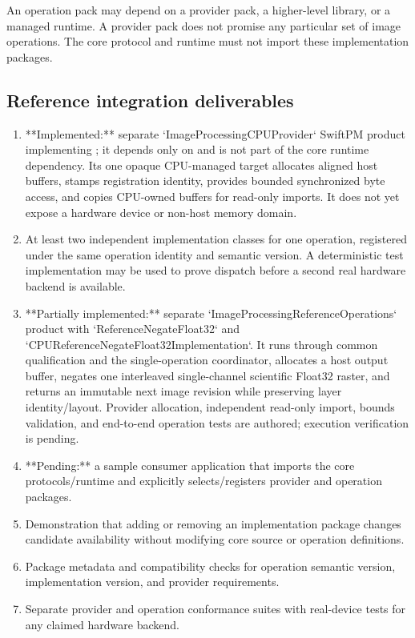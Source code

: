 An operation pack may depend on a provider pack, a higher-level library, or a managed runtime. A provider pack does not promise any particular set of image operations. The core protocol and runtime must not import these implementation packages.

\subsection{Reference integration deliverables}

\begin{enumerate}
  \item **Implemented:** separate `ImageProcessingCPUProvider` SwiftPM product implementing \GEP{}; it depends only on \GEP{} and is not part of the core runtime dependency. Its one opaque CPU-managed target allocates aligned host buffers, stamps registration identity, provides bounded synchronized byte access, and copies CPU-owned buffers for read-only imports. It does not yet expose a hardware device or non-host memory domain.
  \item At least two independent implementation classes for one operation, registered under the same operation identity and semantic version. A deterministic test implementation may be used to prove dispatch before a second real hardware backend is available.
  \item **Partially implemented:** separate `ImageProcessingReferenceOperations` product with `ReferenceNegateFloat32` and `CPUReferenceNegateFloat32Implementation`. It runs through common qualification and the single-operation coordinator, allocates a host output buffer, negates one interleaved single-channel scientific Float32 raster, and returns an immutable next image revision while preserving layer identity/layout. Provider allocation, independent read-only import, bounds validation, and end-to-end operation tests are authored; execution verification is pending.
  \item **Pending:** a sample consumer application that imports the core protocols/runtime and explicitly selects/registers provider and operation packages.
  \item Demonstration that adding or removing an implementation package changes candidate availability without modifying core source or operation definitions.
  \item Package metadata and compatibility checks for operation semantic version, implementation version, and provider requirements.
  \item Separate provider and operation conformance suites with real-device tests for any claimed hardware backend.
\end{enumerate}

